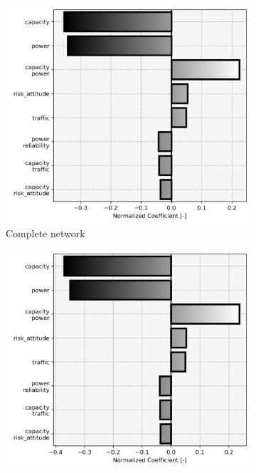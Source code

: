 \begin{figure}[H]
	\centering

\begin{subfigure}[t]{.33\linewidth}
	\centering\captionsetup{width = .8\linewidth}
	\includegraphics[width = \linewidth]{figs/significant_parameters_new_0.png}
	\caption{Complete network}
\end{subfigure}%
\begin{subfigure}[t]{.33\linewidth}
	\centering\captionsetup{width = .8\linewidth}
	\includegraphics[width = \linewidth]{figs/significant_parameters_new_1.png}

\end{subfigure}
\end{figure}
